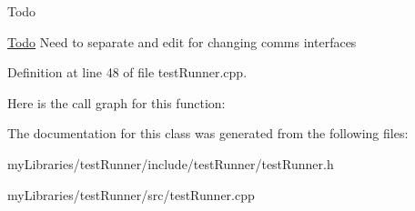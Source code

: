 \begin{DoxyRefDesc}{Todo}
\item[\mbox{\hyperlink{todo__todo000039}{Todo}}]Need to separate and edit for changing comms interfaces \end{DoxyRefDesc}


Definition at line 48 of file test\+Runner.\+cpp.

Here is the call graph for this function\+:


The documentation for this class was generated from the following files\+:\begin{DoxyCompactItemize}
\item 
my\+Libraries/test\+Runner/include/test\+Runner/test\+Runner.\+h\item 
my\+Libraries/test\+Runner/src/test\+Runner.\+cpp\end{DoxyCompactItemize}
